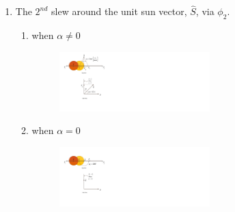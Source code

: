 \documentclass[letterpaper, preprint, paper,11pt]{AAS}	%
\begin{document}
\begin{enumerate}
				\item The $2^{nd}$ slew around the unit sun vector, $\hat{S}$, via $\phi_2$.
				\begin{enumerate}
					\item when $\alpha\neq0$
			\begin{figure}[H]
				\begin{center}
				\includegraphics[width=2.3in]{./Figures/SVAS_2r}
				\end{center}
			\end{figure}
		
	
						\item when $\alpha=0$
				\begin{figure}[H]
					\begin{center}
					\includegraphics[width=2.3in]{./Figures/SVAS_3r}
					\end{center}
				\end{figure}
			\end{enumerate}
		
	

\end{enumerate}
\end{document}

